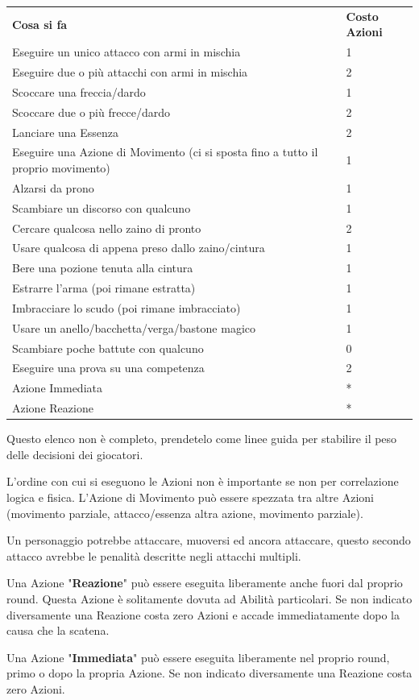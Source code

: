 \documentclass[a4paper,11pt,twoside,openany]{book}
\begin{document}
\begin{tabular}{ll}
\toprule
\textbf{Cosa si fa} & \textbf{Costo Azioni}\tabularnewline
Eseguire un unico attacco con armi in mischia & 1\tabularnewline
Eseguire due o più attacchi con armi in mischia & 2\tabularnewline
Scoccare una freccia/dardo & 1\tabularnewline
Scoccare due o più frecce/dardo & 2\tabularnewline
Lanciare una Essenza & 2\tabularnewline
Eseguire una Azione di Movimento (ci si sposta fino a tutto
il proprio movimento) & 1\tabularnewline
Alzarsi da prono & 1 \tabularnewline
Scambiare un discorso con qualcuno & 1\tabularnewline
Cercare qualcosa nello zaino di pronto & 2\tabularnewline
Usare qualcosa di appena preso dallo zaino/cintura & 1\tabularnewline
Bere una pozione tenuta alla cintura & 1\tabularnewline
Estrarre l'arma (poi rimane estratta) & 1\tabularnewline
Imbracciare lo scudo (poi rimane imbracciato) & 1\tabularnewline
Usare un anello/bacchetta/verga/bastone magico & 1\tabularnewline
Scambiare poche battute con qualcuno & 0\tabularnewline
Eseguire una prova su una competenza & 2\tabularnewline
Azione Immediata & {*}\tabularnewline
Azione Reazione & {*}\tabularnewline

\end{tabular}

\smallskip

Questo elenco non è completo, prendetelo come linee guida per stabilire il peso delle decisioni dei giocatori.

\bigskip

L'ordine con cui si eseguono le Azioni non è importante se non per correlazione logica e fisica. L'Azione di Movimento può essere spezzata tra altre Azioni (movimento parziale, attacco/essenza altra azione, movimento parziale).

Un personaggio potrebbe attaccare, muoversi ed ancora attaccare, questo secondo attacco avrebbe le penalità descritte negli attacchi multipli.
\smallskip

Una Azione "\textbf{Reazione}" può essere eseguita liberamente anche fuori dal proprio round. Questa Azione è solitamente dovuta ad Abilità particolari. Se non indicato diversamente una Reazione costa zero Azioni e accade immediatamente dopo la causa che la scatena.

\smallskip

Una Azione "\textbf{Immediata}" può essere eseguita liberamente nel proprio round, primo o dopo la propria Azione. Se non indicato diversamente una Reazione costa zero Azioni.
\end{document}
